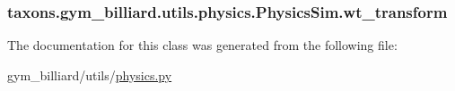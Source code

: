 \subsubsection[{\texorpdfstring{wt\+\_\+transform}{wt_transform}}]{\setlength{\rightskip}{0pt plus 5cm}taxons.\+gym\+\_\+billiard.\+utils.\+physics.\+Physics\+Sim.\+wt\+\_\+transform}\hypertarget{classtaxons_1_1gym__billiard_1_1utils_1_1physics_1_1_physics_sim_a360942bb049c2b038296f86412c44818}{}\label{classtaxons_1_1gym__billiard_1_1utils_1_1physics_1_1_physics_sim_a360942bb049c2b038296f86412c44818}


The documentation for this class was generated from the following file\+:\begin{DoxyCompactItemize}
\item 
gym\+\_\+billiard/utils/\hyperlink{physics_8py}{physics.\+py}\end{DoxyCompactItemize}
